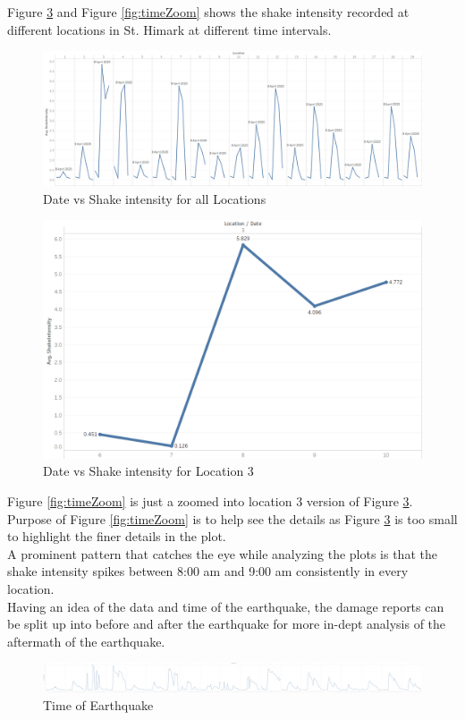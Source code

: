 \documentclass[12pt]{extarticle}
\begin{document}
Figure \ref{fig:time} and Figure \ref{fig:timeZoom} shows the shake intensity recorded at different locations in St. Himark at different time intervals. \\

\begin{figure}[H]
\centering
	\includegraphics[width=\linewidth]{Images/Date.png}
	\caption{Date vs Shake intensity for all Locations }
	\label{fig:date}
\end{figure}

\begin{figure}[H]
\centering
	\includegraphics[width=0.5\linewidth]{Images/DateZoom.png}
	\caption{Date vs Shake intensity for Location 3 }
	\label{fig:dateZoom}
\end{figure}

Figure \ref{fig:timeZoom} is just a zoomed into location 3 version of Figure \ref{fig:time}. Purpose of Figure \ref{fig:timeZoom} is to help see the details as Figure \ref{fig:time} is too small to highlight the finer details in the plot.  \\

A prominent pattern that catches the eye while analyzing the plots is that the shake intensity spikes between 8:00 am and 9:00 am consistently in every location. \\ 

Having an idea of the data and time of the earthquake, the damage reports can be split up into before and after the earthquake for more in-dept analysis of the aftermath of the earthquake. \\
\begin{figure}[H]
\centering
	\includegraphics[width=\linewidth]{Images/time.png}
	\caption{Time of Earthquake}
	\label{fig:time}
\end{figure}
\end{document}

